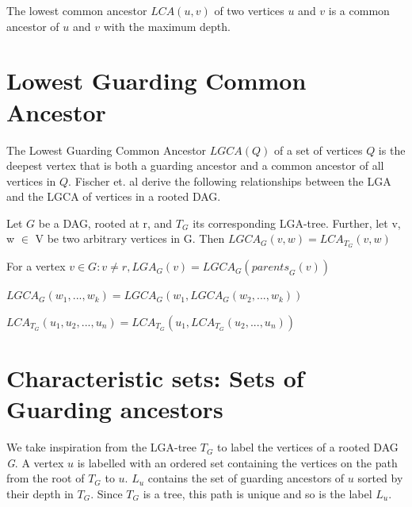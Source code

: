\begin{definition} \label{def:LowestCommonAncestor}
	The lowest common ancestor $LCA(u,v)$ of two vertices $u$ and $v$ is a common ancestor of $u$ and $v$ with the maximum depth.
\end{definition}


\section{Lowest Guarding Common Ancestor} \label{LGCADefinitions}

The Lowest Guarding Common Ancestor $LGCA(Q)$ of a set of vertices $Q$ is the deepest vertex that is both a guarding ancestor and a common ancestor of all vertices in $Q$. Fischer et. al \cite{fischer2010new} derive the following relationships between the LGA and the LGCA of vertices in a rooted DAG.


\begin{lemma}\label{lscaislca}
	Let $G$ be a DAG, rooted at r, and $T_G$  its corresponding LGA-tree. Further, let v, w $\in$ V be two arbitrary vertices in G. Then $LGCA_G(v,w) = LCA_{T_G}(v,w)$
\end{lemma}

\begin{lemma}\label{lgaislgcaofparents}
		For a vertex $v \in G: v \neq r , LGA_G(v) = LGCA_G(\mathit{parents}_G(v))$
\end{lemma}


\begin{definition}\label{associativelgca}
		$LGCA_G (w_1, ... ,w_k) = LGCA_G (w_1, LGCA_G (w_2, ... ,w_k))$
\end{definition}

\begin{definition}\label{associativelca}
	$LCA_{T_G} (u_1, u_2,..., u_n) = LCA_{T_G} (u_1, LCA_{T_G} (u_2,...,u_n))$
\end{definition}

\section{Characteristic sets: Sets of Guarding ancestors}

We take inspiration from the LGA-tree $T_G$ to label the vertices of a rooted DAG \emph{G}.
A vertex $u$ is labelled with an ordered set containing the vertices on the path from the root of $T_G$ to $u$. $L_u$ contains the set of guarding ancestors of $u$ sorted by their depth in $T_G$. Since $T_G$ is a tree, this path is unique and so is the label $L_u$.

